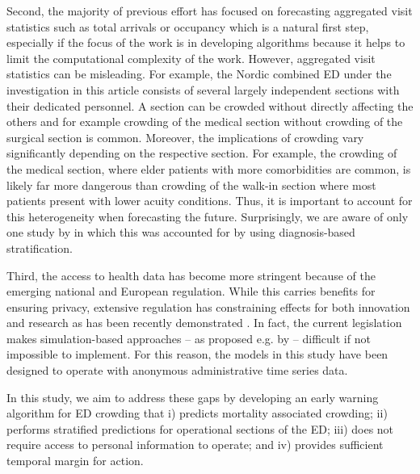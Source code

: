 Second, the majority of previous effort has focused on forecasting aggregated visit statistics such as total arrivals or occupancy which is a natural first step, especially if the focus of the work is in developing algorithms because it helps to limit the computational complexity of the work. However, aggregated visit statistics can be misleading. For example, the Nordic combined ED under the investigation in this article consists of several largely independent sections with their dedicated personnel. A section can be crowded without directly affecting the others and for example crowding of the medical section without crowding of the surgical section is common. Moreover, the implications of crowding vary significantly depending on the respective section. For example, the crowding of the medical section, where elder patients with more comorbidities are common, is likely far more dangerous than crowding of the walk-in section where most patients present with lower acuity conditions. Thus, it is important to account for this heterogeneity when forecasting the future. Surprisingly, we are aware of only one study by \citet{Aroua2015} in which this was accounted for by using diagnosis-based stratification.

Third, the access to health data has become more stringent because of the emerging national and European regulation. While this carries benefits for ensuring privacy, extensive regulation has constraining effects for both innovation and research as has been recently demonstrated \cite{peukert2022, bessen2020, Bruck2023}. In fact, the current legislation makes simulation-based approaches -- as proposed e.g. by \citet{Hoot2008} -- difficult if not impossible to implement. For this reason, the models in this study have been designed to operate with anonymous administrative time series data.

In this study, we aim to address these gaps by developing an early warning algorithm for ED crowding that i) predicts mortality associated crowding; ii) performs stratified predictions for operational sections of the ED; iii) does not require access to personal information to operate; and iv) provides sufficient temporal margin for action. 